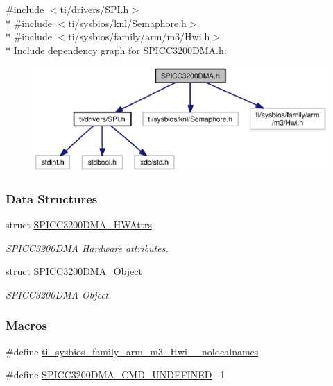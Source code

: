 {\ttfamily \#include $<$ti/drivers/\-S\-P\-I.\-h$>$}\\*
{\ttfamily \#include $<$ti/sysbios/knl/\-Semaphore.\-h$>$}\\*
{\ttfamily \#include $<$ti/sysbios/family/arm/m3/\-Hwi.\-h$>$}\\*
Include dependency graph for S\-P\-I\-C\-C3200\-D\-M\-A.\-h\-:
\nopagebreak
\begin{figure}[H]
\begin{center}
\leavevmode
\includegraphics[width=350pt]{_s_p_i_c_c3200_d_m_a_8h__incl}
\end{center}
\end{figure}
\subsubsection*{Data Structures}
\begin{DoxyCompactItemize}
\item 
struct \hyperlink{struct_s_p_i_c_c3200_d_m_a___h_w_attrs}{S\-P\-I\-C\-C3200\-D\-M\-A\-\_\-\-H\-W\-Attrs}
\begin{DoxyCompactList}\small\item\em S\-P\-I\-C\-C3200\-D\-M\-A Hardware attributes. \end{DoxyCompactList}\item 
struct \hyperlink{struct_s_p_i_c_c3200_d_m_a___object}{S\-P\-I\-C\-C3200\-D\-M\-A\-\_\-\-Object}
\begin{DoxyCompactList}\small\item\em S\-P\-I\-C\-C3200\-D\-M\-A Object. \end{DoxyCompactList}\end{DoxyCompactItemize}
\subsubsection*{Macros}
\begin{DoxyCompactItemize}
\item 
\#define \hyperlink{_s_p_i_c_c3200_d_m_a_8h_aaa17ecf48f5762e2e1bdb0bab8aacf0c}{ti\-\_\-sysbios\-\_\-family\-\_\-arm\-\_\-m3\-\_\-\-Hwi\-\_\-\-\_\-nolocalnames}
\item 
\#define \hyperlink{_s_p_i_c_c3200_d_m_a_8h_a54560cec3d894fbb032f6f9b2fc99365}{S\-P\-I\-C\-C3200\-D\-M\-A\-\_\-\-C\-M\-D\-\_\-\-U\-N\-D\-E\-F\-I\-N\-E\-D}~-\/1
\end{DoxyCompactItemize}
